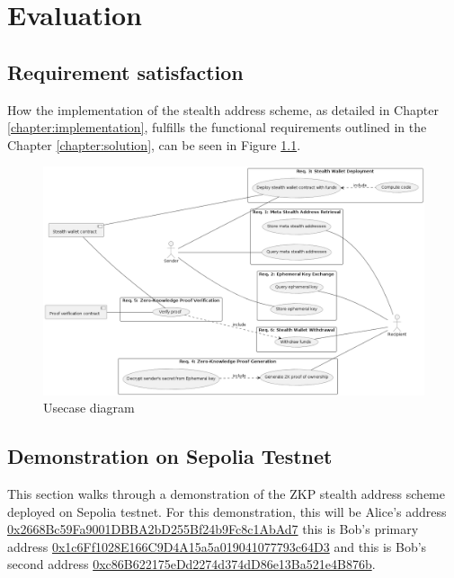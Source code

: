 \chapter{Evaluation}\label{chapter:evaluation}

\section{Requirement satisfaction}

How the implementation of the stealth address scheme, as detailed in Chapter
\ref{chapter:implementation}, fulfills the functional requirements outlined in
the Chapter \ref{chapter:solution}, can be seen in Figure \ref{fig:usecase-diagram}.

\begin{figure}[h!]
    \centering
    \includegraphics[width=\textwidth]{assets/images/usecase-diagram.png}
    \caption{Usecase diagram}
    \label{fig:usecase-diagram}
    \vspace{0.5cm}
\end{figure}
\pagebreak

\section{Demonstration on Sepolia Testnet}

This section walks through a demonstration of the ZKP stealth address scheme
deployed on Sepolia testnet. For this demonstration, this will be Alice's
address \href{https://sepolia.etherscan.io/address/0x2668Bc59Fa9001DBBA2bD255Bf24b9Fc8c1AbAd7}{0x2668Bc59Fa9001DBBA2bD255Bf24b9Fc8c1AbAd7}
this is Bob's primary address
\href{https://sepolia.etherscan.io/address/0x1c6Ff1028E166C9D4A15a5a019041077793c64D3}{0x1c6Ff1028E166C9D4A15a5a019041077793c64D3}
and this is Bob's second address
\href{https://sepolia.etherscan.io/address/0xc86B622175eDd2274d374dD86e13Ba521e4B876b}{0xc86B622175eDd2274d374dD86e13Ba521e4B876b}.

